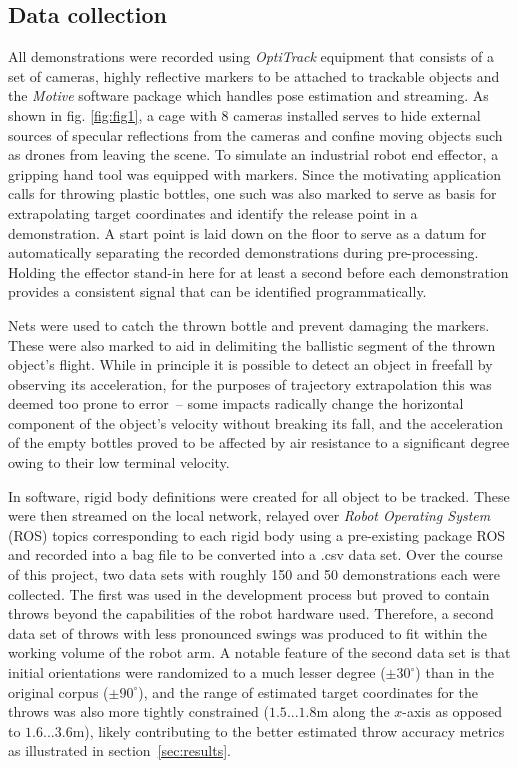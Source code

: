\documentclass{article}
\begin{document}
\subsection{Data collection}
\label{sec:collection}


All demonstrations were recorded using \emph{OptiTrack} equipment that consists of a set of cameras, highly reflective markers to be attached to trackable objects and the \emph{Motive} software package which handles pose estimation and streaming. As shown in fig. \ref{fig:fig1}, a cage with 8 cameras installed serves to hide external sources of specular reflections from the cameras and confine moving objects such as drones from leaving the scene. To simulate an industrial robot end effector, a gripping hand tool was equipped with markers. Since the motivating application calls for throwing plastic bottles, one such was also marked to serve as basis for extrapolating target coordinates and identify the release point in a demonstration. A start point is laid down on the floor to serve as a datum for automatically separating the recorded demonstrations during pre-processing. Holding the effector stand-in here for at least a second before each demonstration provides a consistent signal that can be identified programmatically.

Nets were used to catch the thrown bottle and prevent damaging the markers. These were also marked to aid in delimiting the ballistic segment of the thrown object's flight. While in principle it is possible to detect an object in freefall by observing its acceleration, for the purposes of trajectory extrapolation this was deemed too prone to error~-- some impacts radically change the horizontal component of the object's velocity without breaking its fall, and the acceleration of the empty bottles proved to be affected by air resistance to a significant degree owing to their low terminal velocity.

In software, rigid body definitions were created for all object to be tracked. These were then streamed on the local network, relayed over \emph{Robot Operating System} (ROS) topics corresponding to each rigid body using a pre-existing package ROS and recorded into a bag file to be converted into a .csv data set. Over the course of this project, two data sets with roughly 150 and 50 demonstrations each were collected. The first was used in the development process but proved to contain throws beyond the capabilities of the robot hardware used. Therefore, a second data set of throws with less pronounced swings was produced to fit within the working volume of the robot arm. A notable feature of the second data set is that initial orientations were randomized to a much lesser degree ($\pm30^{\circ}$) than in the original corpus ($\pm90^{\circ}$), and the range of estimated target coordinates for the throws was also more tightly constrained ($1.5 ... 1.8$m along the $x$-axis as opposed to $1.6 ... 3.6$m), likely contributing to the better estimated throw accuracy metrics as illustrated in section~\ref{sec:results}.
\end{document}
